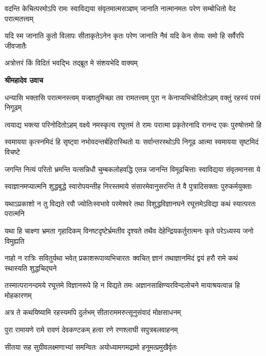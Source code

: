 \fourlineindentedshloka
{वदन्ति केचित्परमोऽपि रामः}
{स्वाविद्यया संवृतमात्मसञ्ज्ञम्}
{जानाति नात्मानमतः परेण}
{सम्बोधितो वेद परात्मतत्त्वम्} %

\fourlineindentedshloka
{यदि स्म जानाति कुतो विलापः}
{सीताकृतेऽनेन कृतः परेण}
{जानाति नैवं यदि केन सेव्यः}
{समो हि सर्वैरपि जीवजातैः} %

\twolineshloka
{अत्रोत्तरं किं विदितं भवद्भिः}
{तद्ब्रूत मे संशयभेदि वाक्यम्} %

\textbf{श्रीमहादेव उवाच}

\fourlineindentedshloka
{धन्यासि भक्तासि परात्मनस्त्वम्}
{यज्ज्ञातुमिच्छा तव रामतत्त्वम्}
{पुरा न केनाप्यभिचोदितोऽहम्}
{वक्तुं रहस्यं परमं निगूढम्} %

\fourlineindentedshloka
{त्वयाद्य भक्त्या परिनोदितोऽहम्}
{वक्ष्ये नमस्कृत्य रघूत्तमं ते}
{रामः परात्मा प्रकृतेरनादि\-}
{रानन्द एकः पुरुषोत्तमो हि} %

\fourlineindentedshloka
{स्वमायया कृत्स्नमिदं हि सृष्ट्वा}
{नभोवदन्तर्बहिरास्थितो यः}
{सर्वान्तरस्थोऽपि निगूढ आत्मा}
{स्वमायया सृष्टमिदं विचष्टे} %

\fourlineindentedshloka
{जगन्ति नित्यं परितो भ्रमन्ति}
{यत्सन्निधौ चुम्बकलोहवद्धि}
{एतन्न जानन्ति विमूढचित्ताः}
{स्वाविद्यया संवृतमानसा ये} %

\fourlineindentedshloka
{स्वाज्ञानमप्यात्मनि शुद्धबुद्धे}
{स्वारोपयन्तीह निरस्तमाये}
{संसारमेवानुसरन्ति ते वै}
{पुत्रादिसक्ताः पुरुकर्मयुक्ताः} %

\fourlineindentedshloka
{यथाऽप्रकाशो न तु विद्यते रवौ}
{ज्योतिःस्वभावे परमेश्वरे तथा}
{विशुद्धविज्ञानघने रघूत्तमेऽविद्या}
{कथं स्यात्परतः परात्मनि} %

\fourlineindentedshloka
{यथा हि चाक्ष्णा भ्रमता गृहादिकम्}
{विनष्टदृष्टेर्भ्रमतीव दृश्यते}
{तथैव देहेन्द्रियकर्तुरात्मनः}
{कृते परेऽध्यस्य जनो विमुह्यति} %

\fourlineindentedshloka
{नाहो न रात्रिः सवितुर्यथा भवेत्}
{प्रकाशरूपाव्यभिचारतः क्वचित्}
{ज्ञानं तथाज्ञानमिदं द्वयं हरौ}
{रामे कथं स्थास्यति शुद्धचिद्घने} %

\fourlineindentedshloka
{तस्मात्परानन्दमये रघूत्तमे}
{विज्ञानरूपे हि न विद्यते तमः}
{अज्ञानसाक्षिण्यरविन्दलोचने}
{मायाश्रयत्वान्न हि मोहकारणम्} %

\twolineshloka
{अत्र ते कथयिष्यामि रहस्यमपि दुर्लभम्}
{सीताराममरुत्सूनुसंवादं मोक्षसाधनम्} %

\twolineshloka
{पुरा रामायणे रामे रावणं देवकण्टकम्}
{हत्वा रणे रणश्लाघी सपुत्रबलवाहनम्} %

\twolineshloka
{सीतया सह सुग्रीवलक्ष्मणाभ्यां समन्वितः}
{अयोध्यामगमद्रामो हनूमत्प्रमुखैर्वृतः} %

